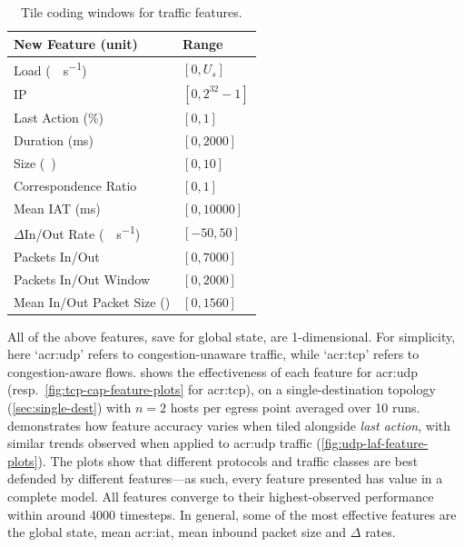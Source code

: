 \begin{table}
	\centering
	\caption{Tile coding windows for traffic features.\label{tab:codings}}
	
	\begin{tabular}{@{}ll@{}}
		\toprule
		New Feature (unit) & Range \\
		\midrule
		Load (\unit{\mega\bit\per\second}) & $[0, U_s]$ \\
		IP & $[0, 2^{32}-1]$ \\
		Last Action (\unit{\percent}) & $[0, 1]$ \\
		Duration (\unit{\milli\second}) & $[0, \num{2000}]$ \\
		Size (\unit{\mebi\byte}) & $[0,10]$ \\
		Correspondence Ratio & $[0,1]$ \\
		Mean IAT (\unit{\milli\second}) & $[0, \num{10000}]$ \\
		$\Delta$In/Out Rate (\unit{\mega\bit\per\second}) & $[-50, 50]$ \\
		Packets In/Out & $[0, 7000]$ \\
		Packets In/Out Window & $[0, 2000]$ \\
		Mean In/Out Packet Size (\unit{\byte}) & $[0, 1560]$ \\
		\bottomrule
	\end{tabular}
\end{table}

All of the above features, save for global state, are 1-dimensional.
For simplicity, here `\gls{acr:udp}' refers to congestion-unaware traffic, while `\gls{acr:tcp}' refers to congestion-aware flows.
 shows the effectiveness of each feature for \gls{acr:udp} (resp.\ \cref{fig:tcp-cap-feature-plots} for \gls{acr:tcp}), on a single-destination topology (\cref{sec:single-dest}) with $n=2$ hosts per egress point averaged over \num{10} runs.
 demonstrates how feature accuracy varies when tiled alongside \emph{last action}, with similar trends observed when applied to \gls{acr:udp} traffic (\cref{fig:udp-laf-feature-plots}).
The plots show that different protocols and traffic classes are best defended by different features---as such, every feature presented has value in a complete model.
All features converge to their highest-observed performance within around \num{4000} timesteps.
In general, some of the most effective features are the global state, mean \gls{acr:iat}, mean inbound packet size and $\Delta$ rates.

